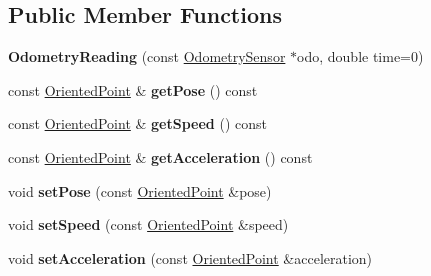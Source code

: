 \subsection*{Public Member Functions}
\begin{DoxyCompactItemize}
\item 
\mbox{\label{classGMapping_1_1OdometryReading_a0aaad11632da8d4a4f96b22d1f82c532}} 
{\bfseries Odometry\+Reading} (const \hyperlink{classGMapping_1_1OdometrySensor}{Odometry\+Sensor} $\ast$odo, double time=0)
\item 
\mbox{\label{classGMapping_1_1OdometryReading_a1dcaf99894fa40443780899762002b60}} 
const \hyperlink{structGMapping_1_1orientedpoint}{Oriented\+Point} \& {\bfseries get\+Pose} () const
\item 
\mbox{\label{classGMapping_1_1OdometryReading_a59897e4e3593af7ac64c0c4718f03371}} 
const \hyperlink{structGMapping_1_1orientedpoint}{Oriented\+Point} \& {\bfseries get\+Speed} () const
\item 
\mbox{\label{classGMapping_1_1OdometryReading_af4637bb83887c798bd46e9abe6f181fb}} 
const \hyperlink{structGMapping_1_1orientedpoint}{Oriented\+Point} \& {\bfseries get\+Acceleration} () const
\item 
\mbox{\label{classGMapping_1_1OdometryReading_abbe380b5e615a2aba1b65ef939e897da}} 
void {\bfseries set\+Pose} (const \hyperlink{structGMapping_1_1orientedpoint}{Oriented\+Point} \&pose)
\item 
\mbox{\label{classGMapping_1_1OdometryReading_a59dfd8057c91a75e64d6fc86ceb71382}} 
void {\bfseries set\+Speed} (const \hyperlink{structGMapping_1_1orientedpoint}{Oriented\+Point} \&speed)
\item 
\mbox{\label{classGMapping_1_1OdometryReading_a370bb324919a19be1faec5697dde7914}} 
void {\bfseries set\+Acceleration} (const \hyperlink{structGMapping_1_1orientedpoint}{Oriented\+Point} \&acceleration)
\end{DoxyCompactItemize}
